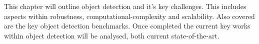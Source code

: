 This chapter will outline object detection and it's key challenges. This includes aspects within robustness, computational-complexity and scalability. Also covered are the key object detection benchmarks. Once completed the current key works within object detection will be analysed, both current state-of-the-art. 

